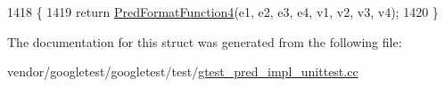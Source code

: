 \begin{DoxyCode}
1418                                                           \{
1419     \textcolor{keywordflow}{return} \hyperlink{gtest__pred__impl__unittest_8cc_a9fbd4c3333dcc98c0cfee19ce28bc2b1}{PredFormatFunction4}(e1, e2, e3, e4, v1, v2, v3, v4);
1420   \}
\end{DoxyCode}


The documentation for this struct was generated from the following file\+:\begin{DoxyCompactItemize}
\item 
vendor/googletest/googletest/test/\hyperlink{gtest__pred__impl__unittest_8cc}{gtest\+\_\+pred\+\_\+impl\+\_\+unittest.\+cc}\end{DoxyCompactItemize}
